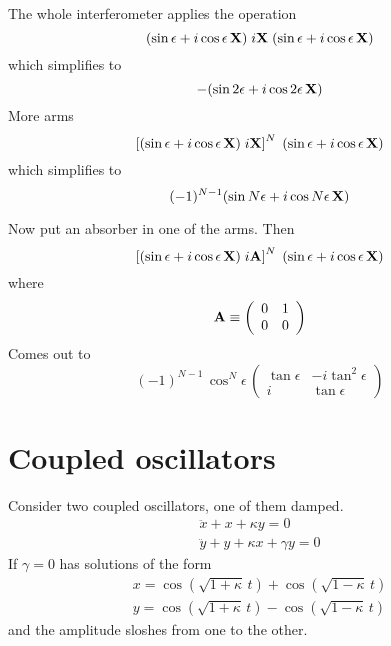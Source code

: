 \documentclass[12pt,aps,prb,preprint]{revtex4}
\def\X{{\bf X}}
\def\A{{\bf A}}
\begin{document}
The whole interferometer applies the operation
\begin{equation}
     (\sin\epsilon + i\cos\epsilon\,\X)
     \; i\X \;
     (\sin\epsilon + i\cos\epsilon\,\X)
\end{equation}
which simplifies to
\begin{equation}
     -(\sin2\epsilon + i\cos2\epsilon\,\X)
\end{equation}
More arms
\begin{equation}
     \left[ (\sin\epsilon + i\cos\epsilon\,\X) \; i\X \right]^N \;
     (\sin\epsilon + i\cos\epsilon\,\X)
\end{equation}
which simplifies to
\begin{equation}
     (-1)^{N-1} (\sin N\epsilon + i\cos N\epsilon\,\X)
\end{equation}

Now put an absorber in one of the arms.  Then
\begin{equation}
     \left[ (\sin\epsilon + i\cos\epsilon\,\X) \; i\A \right]^N \;
     (\sin\epsilon + i\cos\epsilon\,\X)
\end{equation}
where
\begin{equation}
\A \equiv \left( \begin{array}{cc} 0 & 1 \\ 0 & 0 \end{array} \right)
\end{equation}
Comes out to
\begin{equation}
(-1)^{N-1} \, \cos^N\!\epsilon \,
\left( \begin{array}{cc} \tan\epsilon & -i\tan^2\epsilon \\
                         i            & \tan\epsilon 
       \end{array} \right)
\end{equation}

\section{Coupled oscillators}

Consider two coupled oscillators, one of them damped.
\begin{equation}
\begin{array}{l}
\ddot x + x + \kappa y = 0 \\
\ddot y + y + \kappa x + \gamma y = 0
\end{array}
\end{equation}
If $\gamma=0$ has solutions of the form
\begin{equation}
\begin{array}{l}
x = \cos(\sqrt{1+\kappa}\,t) + \cos(\sqrt{1-\kappa}\,t)  \\
y = \cos(\sqrt{1+\kappa}\,t) - \cos(\sqrt{1-\kappa}\,t)
\end{array}
\end{equation}
and the amplitude sloshes from one to the other.
\end{document}
